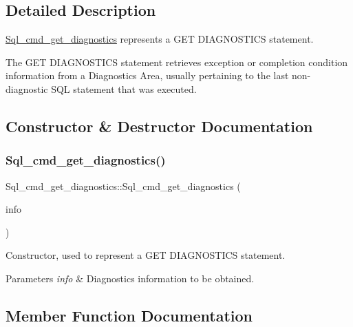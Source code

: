 \subsection{Detailed Description}
\mbox{\hyperlink{classSql__cmd__get__diagnostics}{Sql\+\_\+cmd\+\_\+get\+\_\+diagnostics}} represents a G\+ET D\+I\+A\+G\+N\+O\+S\+T\+I\+CS statement.

The G\+ET D\+I\+A\+G\+N\+O\+S\+T\+I\+CS statement retrieves exception or completion condition information from a Diagnostics Area, usually pertaining to the last non-\/diagnostic S\+QL statement that was executed. 

\subsection{Constructor \& Destructor Documentation}
\mbox{\label{classSql__cmd__get__diagnostics_abf6608b7d7c5a38eee06486520176b7c}} 
\subsubsection{\texorpdfstring{Sql\+\_\+cmd\+\_\+get\+\_\+diagnostics()}{Sql\_cmd\_get\_diagnostics()}}
{\footnotesize\ttfamily Sql\+\_\+cmd\+\_\+get\+\_\+diagnostics\+::\+Sql\+\_\+cmd\+\_\+get\+\_\+diagnostics (\begin{DoxyParamCaption}\item[{\mbox{\hyperlink{classDiagnostics__information}{Diagnostics\+\_\+information}} $\ast$}]{info }\end{DoxyParamCaption})\hspace{0.3cm}{\ttfamily [inline]}}

Constructor, used to represent a G\+ET D\+I\+A\+G\+N\+O\+S\+T\+I\+CS statement.


\begin{DoxyParams}{Parameters}
{\em info} & Diagnostics information to be obtained. \\
\hline
\end{DoxyParams}


\subsection{Member Function Documentation}
\mbox{\label{classSql__cmd__get__diagnostics_aecafd1b2d00aace5a5b238b764aadbab}} 
